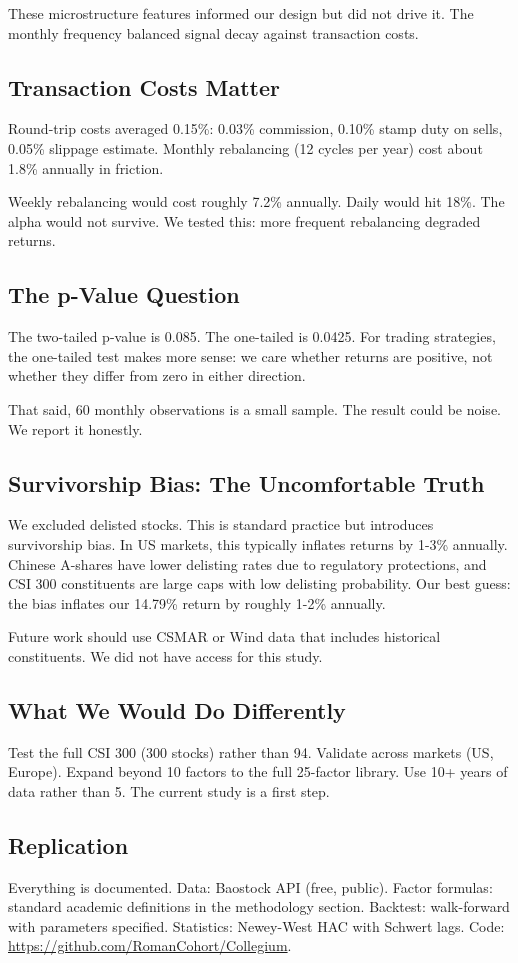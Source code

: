 These microstructure features informed our design but did not drive it. The monthly frequency balanced signal decay against transaction costs.

\subsection{Transaction Costs Matter}

Round-trip costs averaged 0.15\%: 0.03\% commission, 0.10\% stamp duty on sells, 0.05\% slippage estimate. Monthly rebalancing (12 cycles per year) cost about 1.8\% annually in friction.

Weekly rebalancing would cost roughly 7.2\% annually. Daily would hit 18\%. The alpha would not survive. We tested this: more frequent rebalancing degraded returns.

\subsection{The p-Value Question}

The two-tailed p-value is 0.085. The one-tailed is 0.0425. For trading strategies, the one-tailed test makes more sense: we care whether returns are positive, not whether they differ from zero in either direction.

That said, 60 monthly observations is a small sample. The result could be noise. We report it honestly.

\subsection{Survivorship Bias: The Uncomfortable Truth}

We excluded delisted stocks. This is standard practice but introduces survivorship bias. In US markets, this typically inflates returns by 1-3\% annually. Chinese A-shares have lower delisting rates due to regulatory protections, and CSI 300 constituents are large caps with low delisting probability. Our best guess: the bias inflates our 14.79\% return by roughly 1-2\% annually.

Future work should use CSMAR or Wind data that includes historical constituents. We did not have access for this study.

\subsection{What We Would Do Differently}

Test the full CSI 300 (300 stocks) rather than 94. Validate across markets (US, Europe). Expand beyond 10 factors to the full 25-factor library. Use 10+ years of data rather than 5. The current study is a first step.

\subsection{Replication}

Everything is documented. Data: Baostock API (free, public). Factor formulas: standard academic definitions in the methodology section. Backtest: walk-forward with parameters specified. Statistics: Newey-West HAC with Schwert lags. Code: \url{https://github.com/RomanCohort/Collegium}.
